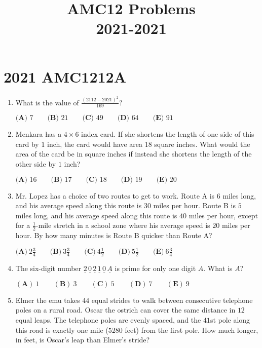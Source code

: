 \documentclass{article}
\title{AMC12 Problems \\ 2021-2021}
\date{}
\begin{document}
\maketitle\thispagestyle{fancy}\tableofcontents\newpage\section*{2021 AMC1212A}\begin{enumerate}[label=\arabic*., itemsep=0.5em]\item What is the value of $\frac{(2112-2021)^2}{169}$?

$\textbf{(A) } 7 \qquad\textbf{(B) } 21 \qquad\textbf{(C) } 49 \qquad\textbf{(D) } 64 \qquad\textbf{(E) } 91$\par \vspace{0.5em}\item Menkara has a $4 \times 6$ index card. If she shortens the length of one side of this card by $1$ inch, the card would have area $18$ square inches. What would the area of the card be in square inches if instead she shortens the length of the other side by $1$ inch?

$\textbf{(A) }16\qquad\textbf{(B) }17\qquad\textbf{(C) }18\qquad\textbf{(D) }19\qquad\textbf{(E) }20$\par \vspace{0.5em}\item Mr. Lopez has a choice of two routes to get to work. Route A is $6$ miles long, and his average speed along this route is $30$ miles per hour. Route B is $5$ miles long, and his average speed along this route is $40$ miles per hour, except for a $\frac{1}{2}$-mile stretch in a school zone where his average speed is $20$ miles per hour. By how many minutes is Route B quicker than Route A?

$\textbf{(A)}\ 2 \frac{3}{4}  \qquad\textbf{(B)}\  3 \frac{3}{4} \qquad\textbf{(C)}\  4 \frac{1}{2} \qquad\textbf{(D)}\
 5 \frac{1}{2} \qquad\textbf{(E)}\ 6 \frac{3}{4}$\par \vspace{0.5em}\item The six-digit number $\underline{2}\,\underline{0}\,\underline{2}\,\underline{1}\,\underline{0}\,\underline{A}$ is prime for only one digit $A.$ What is $A?$

$(\textbf{A})\: 1\qquad(\textbf{B}) \: 3\qquad(\textbf{C}) \: 5 \qquad(\textbf{D}) \: 7\qquad(\textbf{E}) \: 9$\par \vspace{0.5em}\item Elmer the emu takes $44$ equal strides to walk between consecutive telephone poles on a rural road. Oscar the ostrich can cover the same distance in $12$ equal leaps. The telephone poles are evenly spaced, and the $41$st pole along this road is exactly one mile ($5280$ feet) from the first pole. How much longer, in feet, is Oscar's leap than Elmer's stride?


\end{enumerate}
\end{document}
